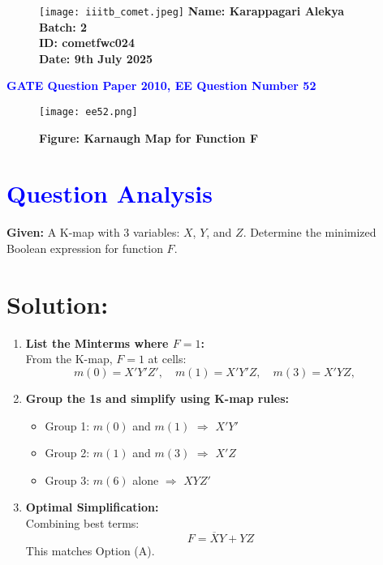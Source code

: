\documentclass[twocolumn]{article}
\begin{document}
\begin{figure}[t]
    \texttt{[image: iiitb\_comet.jpeg]} %
    \textbf{Name: Karappagari Alekya} \\
    \textbf{Batch: 2} \\
    \textbf{ID: cometfwc024} \\
    \textbf{Date: 9th July 2025}
\end{figure}

\begin{center}
    {\LARGE \textbf{\textcolor{blue}{GATE Question Paper 2010, EE Question Number 52}}}
\end{center}

\vspace{1em}
\begin{figure}[h]
    \centering
    \texttt{[image: ee52.png]}
    \caption*{\textbf{Figure: Karnaugh Map for Function F}}
\end{figure}

\section*{\textcolor{blue}{Question Analysis}}
\textbf{Given:} A K-map with 3 variables: $X$, $Y$, and $Z$. Determine the minimized Boolean expression for function $F$.

\section*{Solution:}

\begin{enumerate}[label=\textbf{Step \arabic*:}]
    \item \textbf{List the Minterms where $F=1$:} \\
    From the K-map, $F=1$ at cells:
    \[
    m(0) = X'Y'Z',\quad
    m(1) = X'Y'Z,\quad
    m(3) = X'Y Z,\quad
    \]

    \item \textbf{Group the 1s and simplify using K-map rules:}
    \begin{itemize}
        \item Group 1: $m(0)$ and $m(1)$ $\Rightarrow$ $X'Y'$
        \item Group 2: $m(1)$ and $m(3)$ $\Rightarrow$ $X'Z$
        \item Group 3: $m(6)$ alone $\Rightarrow$ $XY Z'$
    \end{itemize}

    \item \textbf{Optimal Simplification:} \\
    Combining best terms:
    \[
    F = \overline{X}Y + YZ
    \]
    This matches Option (A).
\end{enumerate}
\end{document}
